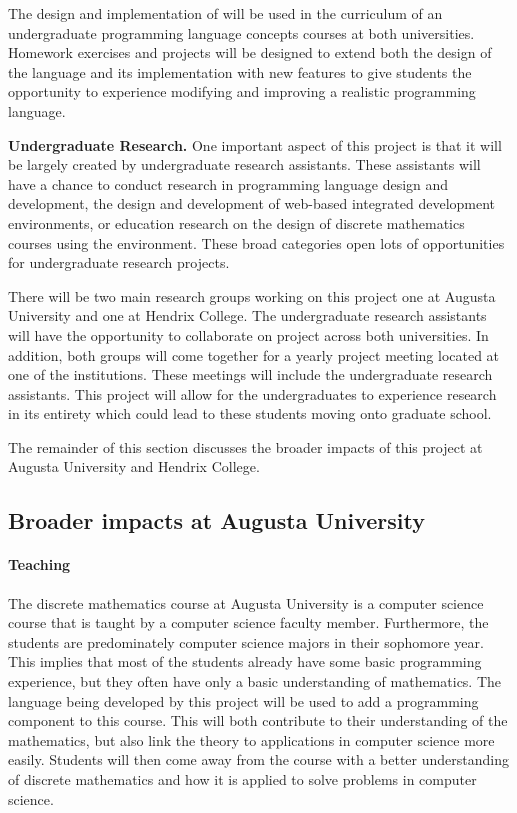 The design and implementation of \thelang{} will be used in the
curriculum of an undergraduate programming language concepts courses
at both universities.  Homework exercises and projects will be
designed to extend both the design of the language and its
implementation with new features to give students the opportunity to
experience modifying and improving a realistic programming language.

\textbf{Undergraduate Research.} One important aspect of this project
is that it will be largely created by undergraduate research
assistants.  These assistants will have a chance to conduct research
in programming language design and development, the design and
development of web-based integrated development environments, or
education research on the design of discrete mathematics courses using
the \thelang{} environment.  These broad categories open lots of
opportunities for undergraduate research projects.

There will be two main research groups working on this project one at
Augusta University and one at Hendrix College.  The undergraduate
research assistants will have the opportunity to collaborate on
project across both universities.  In addition, both groups will come
together for a yearly project meeting located at one of the
institutions.  These meetings will include the undergraduate research
assistants.  This project will allow for the undergraduates to
experience research in its entirety which could lead to these students
moving onto graduate school.

The remainder of this section discusses the broader impacts of this
project at Augusta University and Hendrix College.

\subsection{Broader impacts at Augusta University}
\label{subsec:broader_impacts_at_augusta_university}

\paragraph{Teaching}  The discrete mathematics course at Augusta
University is a computer science course that is taught by a computer
science faculty member.  Furthermore, the students are predominately
computer science majors in their sophomore year.  This implies that
most of the students already have some basic programming experience,
but they often have only a basic understanding of mathematics.  The
language being developed by this project will be used to add a
programming component to this course.  This will both contribute to
their understanding of the mathematics, but also link the theory to
applications in computer science more easily.  Students will then come
away from the course with a better understanding of discrete
mathematics and how it is applied to solve problems in computer
science.

